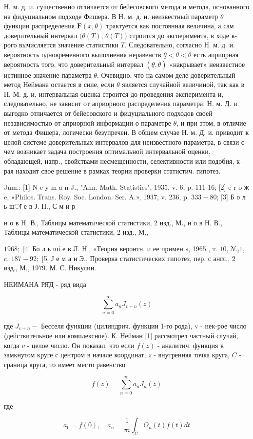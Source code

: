 \documentclass[10pt]{article}
\begin{document}
Н. м. д. и. существенно отличается от бейесовского метода и метода, основанного на фидуциальном подходе Фишера. В Н. м. д. и. неизвестный параметр $\theta$ функции распределения $\boldsymbol{F}(x, \theta)$ трактуется как постоянная величина, а сам доверительный интервал $(\underline{\theta}(T)$, $\bar{\theta}(T))$ строится до эксперимента, в ходе к-рого вычисляется значение статистики $T$. Следовательно, согласно Н. м. д. и. вероятность одновременного выполнения неравенств $\underline{\theta}<\theta<\bar{\theta}$ есть априорная вероятность того, что доверительный интервал $(\underline{\theta}, \bar{\theta})$ «накрывает» неизвестное истинное значение параметра $\theta$. Очевидно, что на самом деле доверительный метод Неймана остается в силе, если $\theta$ является случайной величиной, так как в Н. М. д. и. интервальная оценка строится до проведения әксперимента и, следовательно, не зависит от априорного распределения параметра. Н. м. Д. и. выгодно отличается от бейесовского и фидуциального подходов своей независимостью от априорной информации о параметре $\theta$, и при этом, в отличие от метода Фишера, логически безупречен. В общем случае Н. м. Д. и. приводит к целой системе доверительных интервалов для неизвестного параметра, в связи с чем возникает задача построения оптимальной интервальной оценки, обладающей, напр., свойствами несмещенности, селективности или подобия, к-рая находит свое решение в рамках теории проверки статистич. гипотез.



Jum.: [1] N e y m a n J., "Ann. Math. Statistics", 1935, v. 6, p. 111-16; [2] e r o ж e, «Philos. Trans. Roy. Soc. London. Ser. A.», 1937, v. 236, p. $333-80$; [3] Б о л ь шा е в Ј. Н., С м и р-

н о в H. В., Таблицы математической статистики, 2 изд., М., н о в Н. В., Таблицы математической статистики, 2 изд., М.,

$1968 ;$ [4] Бо л ь ші е в Л. Н., «Теория веронтн. и ее примен.», 1965 , т. $10, \mathcal{N}_{2} 1$, c. $187-92 ;$ [5] Ј е м а н Э., Проверка статистических гипотез, пер. с англ., 2 изд., М., 1979. М. С. Никулин.



НЕИМАНА РЯ̆Д - ряд вида



\[

\sum_{n=0}^{\infty} a_{n} J_{v+n}(z)

\]



где $J_{v+n}-$ Бесселя функции (цилиндрич. функции 1-го рода), v - нек-рое число (действительное или комплексное). К. Нейман [1] рассмотрел частный случай, когда $v$ - целое число. Он показал, что если $f(z)$ - аналитич. функция в замкнутом круге с центром в начале координат, $z$ - внутренняя точка круга, $C$ - граница круга, то имеет место равенство



\[

f(z)=\sum_{n=0}^{\infty} a_{n} J_{n}(z)

\]



где



\[

a_{0}=f(0), \quad a_{n}=\frac{1}{\pi i} \int_{C} O_{n}(t) f(t) d t

\]
\end{document}

